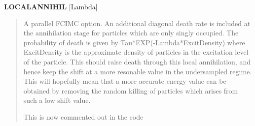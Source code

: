 \documentclass[openany,a4paper,10pt,english]{manual}
\begin{document}
\textbf{LOCALANNIHIL} {[}Lambda{]}
\begin{quote}

A parallel FCIMC option. An additional diagonal death rate is included at the annihilation
stage for particles which are only singly occupied. The probability of death is given by
Tau*EXP(-Lambda*ExcitDensity) where ExcitDensity is the approximate density of particles in
the excitation level of the particle. This should raise death through this local annihilation,
and hence keep the shift at a more resonable value in the undersampled regime. This will
hopefully mean that a more accurate energy value can be obtained by removing the random
killing of particles which arises from such a low shift value.

This is now commented out in the code
\end{quote}
\end{document}
